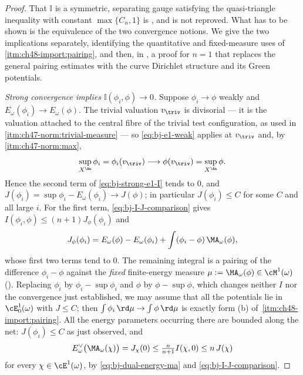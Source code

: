 \begin{proof}
That $\mathbb I$ is a symmetric, separating gauge satisfying the
quasi-triangle inequality with constant $\max\{C_n,1\}$ is
, and is not reproved.  What has to be shown is
the equivalence of the two convergence notions.  We give the two
implications separately, identifying the quantitative and fixed-measure
uses of \,\cref{itm:ch48-import:pairing}, and then,
in , a proof for $n=1$ that replaces the general pairing estimates
with the curve Dirichlet structure and its Green potentials.

\emph{Strong convergence implies $\mathbb I(\phi_i,\phi)\to0$.}  Suppose
$\phi_i\to\phi$ weakly and $E_\omega(\phi_i)\to E_\omega(\phi)$.  The
trivial valuation $v_{\triv}$ is divisorial --- it is the valuation
attached to the central fibre of the trivial test configuration, as used in
\,\cref{itm:ch47-norm:trivial-measure}
--- so \eqref{eq:bj-e1-weak} applies at $v_{\triv}$ and, by
\,\cref{itm:ch47-norm:max},
\[
 \sup_{X^{\An}}\phi_i=\phi_i(v_{\triv})\longrightarrow
 \phi(v_{\triv})=\sup_{X^{\An}}\phi .
\]
Hence the second term of \eqref{eq:bj-strong-e1-I} tends to $0$, and
$J(\phi_i)=\sup\phi_i-E_\omega(\phi_i)\to J(\phi)$; in particular
$J(\phi_i)\le C$ for some $C$ and all large $i$.  For the first term,
\eqref{eq:bj-I-J-comparison} gives
$I(\phi_i,\phi)\le(n+1)J_\phi(\phi_i)$ and
\[
 J_\phi(\phi_i)=E_\omega(\phi)-E_\omega(\phi_i)
 +\int(\phi_i-\phi)\,\MA_\omega(\phi),
\]
whose first two terms tend to $0$.  The remaining integral is a pairing
of the difference $\phi_i-\phi$ against the \emph{fixed} finite-energy
measure $\mu:=\MA_\omega(\phi)\in\cM^1(\omega)$
().  Replacing $\phi_i$ by
$\phi_i-\sup\phi_i$ and $\phi$ by $\phi-\sup\phi$, which changes
neither $I$ nor the convergence just established, we may assume that all
the potentials lie in $\cE^1_0(\omega)$ with $J\le C$; then
$\int\phi_i\,\rd\mu\to\int\phi\,\rd\mu$ is exactly form (b) of
\,\cref{itm:ch48-import:pairing}.  All the energy
parameters occurring there are bounded along the net: $J(\phi_i)\le C$ as
just observed, and
\[
 E^\vee_\omega\bigl(\MA_\omega(\chi)\bigr)
 =J_\chi(0)\le\tfrac n{n+1}I(\chi,0)\le n\,J(\chi)
\]
for every $\chi\in\cE^1(\omega)$, by \eqref{eq:bj-dual-energy-ma} and
\eqref{eq:bj-I-J-comparison}.


\end{proof}
